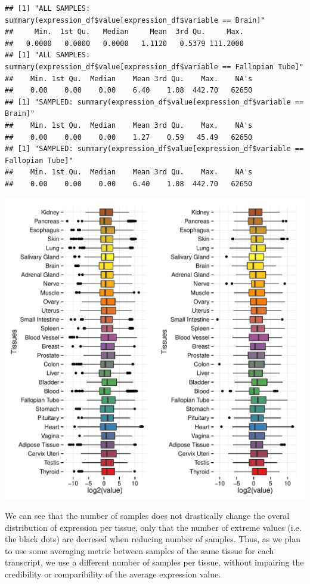 \documentclass{article}\usepackage[]{graphicx}\usepackage[]{color}
\makeatletter
\def\maxwidth{ %
  \ifdim\Gin@nat@width>\linewidth
    \linewidth
  \else
    \Gin@nat@width
  \fi
}
\newenvironment{kframe}{%
 \def\at@end@of@kframe{}%
 \ifinner\ifhmode%
  \def\at@end@of@kframe{\end{minipage}}%
  \begin{minipage}{\columnwidth}%
 \fi\fi%
 \def\FrameCommand##1{\hskip\@totalleftmargin \hskip-\fboxsep
 \colorbox{shadecolor}{##1}\hskip-\fboxsep
     \hskip-\linewidth \hskip-\@totalleftmargin \hskip\columnwidth}%
 \MakeFramed {\advance\hsize-\width
   \@totalleftmargin\z@ \linewidth\hsize
   \@setminipage}}%
 {\par\unskip\endMakeFramed%
 \at@end@of@kframe}
\newenvironment{knitrout}{}{} %
\makeatother
\begin{document}
\begin{knitrout}
\color{fgcolor}\begin{kframe}
\begin{verbatim}
## [1] "ALL SAMPLES: summary(expression_df$value[expression_df$variable == Brain]"
##     Min.  1st Qu.   Median     Mean  3rd Qu.     Max. 
##   0.0000   0.0000   0.0000   1.1120   0.5379 111.2000 
## [1] "ALL SAMPLES: summary(expression_df$value[expression_df$variable == Fallopian Tube]"
##    Min. 1st Qu.  Median    Mean 3rd Qu.    Max.    NA's 
##    0.00    0.00    0.00    6.40    1.08  442.70   62650 
## [1] "SAMPLED: summary(expression_df$value[expression_df$variable == Brain]"
##    Min. 1st Qu.  Median    Mean 3rd Qu.    Max.    NA's 
##    0.00    0.00    0.00    1.27    0.59   45.49   62650 
## [1] "SAMPLED: summary(expression_df$value[expression_df$variable == Fallopian Tube]"
##    Min. 1st Qu.  Median    Mean 3rd Qu.    Max.    NA's 
##    0.00    0.00    0.00    6.40    1.08  442.70   62650
\end{verbatim}
\end{kframe}
\includegraphics[width=\maxwidth]{figure/expression_per_tissue-1} 

\end{knitrout}

We can see that the number of samples does not drastically change the overal distribution of expression per tissue, only that the number of extreme values (i.e. the black dots) are decresed when reducing number of samples. Thus, as we plan to use some averaging metric between samples of the same tissue for each transcript, we use a different number of samples per tissue, without impairing the credibility or comparibility of the average expression value.
\end{document}
